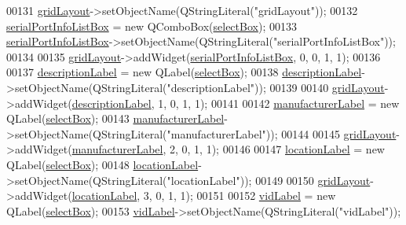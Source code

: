 \begin{DoxyCode}
00131         \hyperlink{a00029_a07d152c7cc63e2cffdda613baea54c0f}{gridLayout}->setObjectName(QStringLiteral(\textcolor{stringliteral}{"gridLayout"}));
00132         \hyperlink{a00029_a323eca0d6d4b94d2d41c7737fe8b2282}{serialPortInfoListBox} = \textcolor{keyword}{new} QComboBox(\hyperlink{a00029_aea3871481f7ecb94f1835e519631f9a2}{selectBox});
00133         \hyperlink{a00029_a323eca0d6d4b94d2d41c7737fe8b2282}{serialPortInfoListBox}->setObjectName(QStringLiteral(\textcolor{stringliteral}{"serialPortInfoListBox"}));
00134 
00135         \hyperlink{a00029_a07d152c7cc63e2cffdda613baea54c0f}{gridLayout}->addWidget(\hyperlink{a00029_a323eca0d6d4b94d2d41c7737fe8b2282}{serialPortInfoListBox}, 0, 0, 1, 1);
00136 
00137         \hyperlink{a00029_aaf2756662f744e79aa3443f1e035870d}{descriptionLabel} = \textcolor{keyword}{new} QLabel(\hyperlink{a00029_aea3871481f7ecb94f1835e519631f9a2}{selectBox});
00138         \hyperlink{a00029_aaf2756662f744e79aa3443f1e035870d}{descriptionLabel}->setObjectName(QStringLiteral(\textcolor{stringliteral}{"descriptionLabel"}));
00139 
00140         \hyperlink{a00029_a07d152c7cc63e2cffdda613baea54c0f}{gridLayout}->addWidget(\hyperlink{a00029_aaf2756662f744e79aa3443f1e035870d}{descriptionLabel}, 1, 0, 1, 1);
00141 
00142         \hyperlink{a00029_afeadc7657c9eaa3103bd529342f5fe97}{manufacturerLabel} = \textcolor{keyword}{new} QLabel(\hyperlink{a00029_aea3871481f7ecb94f1835e519631f9a2}{selectBox});
00143         \hyperlink{a00029_afeadc7657c9eaa3103bd529342f5fe97}{manufacturerLabel}->setObjectName(QStringLiteral(\textcolor{stringliteral}{"manufacturerLabel"}));
00144 
00145         \hyperlink{a00029_a07d152c7cc63e2cffdda613baea54c0f}{gridLayout}->addWidget(\hyperlink{a00029_afeadc7657c9eaa3103bd529342f5fe97}{manufacturerLabel}, 2, 0, 1, 1);
00146 
00147         \hyperlink{a00029_ad860892f11a79cb726643d3478078fcd}{locationLabel} = \textcolor{keyword}{new} QLabel(\hyperlink{a00029_aea3871481f7ecb94f1835e519631f9a2}{selectBox});
00148         \hyperlink{a00029_ad860892f11a79cb726643d3478078fcd}{locationLabel}->setObjectName(QStringLiteral(\textcolor{stringliteral}{"locationLabel"}));
00149 
00150         \hyperlink{a00029_a07d152c7cc63e2cffdda613baea54c0f}{gridLayout}->addWidget(\hyperlink{a00029_ad860892f11a79cb726643d3478078fcd}{locationLabel}, 3, 0, 1, 1);
00151 
00152         \hyperlink{a00029_a50c8fdd36faae6146740e37728af71f2}{vidLabel} = \textcolor{keyword}{new} QLabel(\hyperlink{a00029_aea3871481f7ecb94f1835e519631f9a2}{selectBox});
00153         \hyperlink{a00029_a50c8fdd36faae6146740e37728af71f2}{vidLabel}->setObjectName(QStringLiteral(\textcolor{stringliteral}{"vidLabel"}));

\end{DoxyCode}
